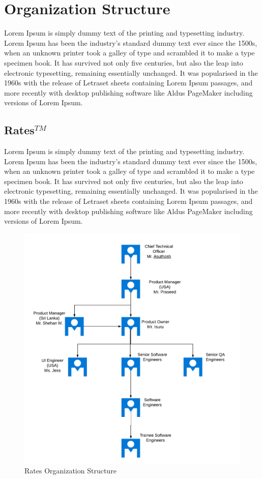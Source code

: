 \documentclass[12pt,a4paper]{report}
\begin{document}
\section{Organization Structure}
Lorem Ipsum is simply dummy text of the printing and typesetting industry. Lorem Ipsum has been the industry's standard dummy text ever since the 1500s, when an unknown printer took a galley of type and scrambled it to make a type specimen book. It has survived not only five centuries, but also the leap into electronic typesetting, remaining essentially unchanged. It was popularised in the 1960s with the release of Letraset sheets containing Lorem Ipsum passages, and more recently with desktop publishing software like Aldus PageMaker including versions of Lorem Ipsum.


\subsection*{Rates$^{TM}$}
Lorem Ipsum is simply dummy text of the printing and typesetting industry. Lorem Ipsum has been the industry's standard dummy text ever since the 1500s, when an unknown printer took a galley of type and scrambled it to make a type specimen book. It has survived not only five centuries, but also the leap into electronic typesetting, remaining essentially unchanged. It was popularised in the 1960s with the release of Letraset sheets containing Lorem Ipsum passages, and more recently with desktop publishing software like Aldus PageMaker including versions of Lorem Ipsum.
\begin{figure}[H]
\includegraphics[scale=.7]{Structure.png}
  \caption{Rates Organization Structure}
  \label{fig:Structure}
\end{figure}
\end{document}
